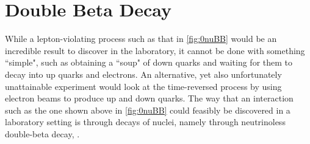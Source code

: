 \chapter{Double Beta Decay}
\label{chap:Beta Decay}

While a lepton-violating process such as that in \autoref{fig:0nuBB} would be an incredible result to discover in the laboratory, it cannot be done with something ``simple", such as obtaining a ``soup" of down quarks and waiting for them to decay into up quarks and electrons.
An alternative, yet also unfortunately unattainable experiment would look at the time-reversed process by using electron beams to produce up and down quarks.
The way that an interaction such as the one shown above in \autoref{fig:0nuBB} could feasibly be discovered in a laboratory setting is through decays of nuclei, namely through neutrinoless double-beta decay, \zeronubb. 
